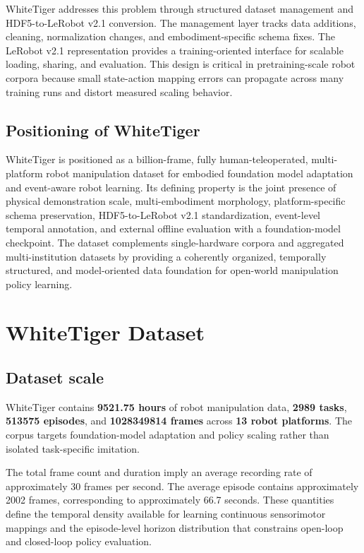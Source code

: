 WhiteTiger addresses this problem through structured dataset management and HDF5-to-LeRobot v2.1 conversion. The management layer tracks data additions, cleaning, normalization changes, and embodiment-specific schema fixes. The LeRobot v2.1 representation provides a training-oriented interface for scalable loading, sharing, and evaluation. This design is critical in pretraining-scale robot corpora because small state-action mapping errors can propagate across many training runs and distort measured scaling behavior.

\subsection{Positioning of WhiteTiger}

WhiteTiger is positioned as a billion-frame, fully human-teleoperated, multi-platform robot manipulation dataset for embodied foundation model adaptation and event-aware robot learning. Its defining property is the joint presence of physical demonstration scale, multi-embodiment morphology, platform-specific schema preservation, HDF5-to-LeRobot v2.1 standardization, event-level temporal annotation, and external offline evaluation with a foundation-model checkpoint. The dataset complements single-hardware corpora and aggregated multi-institution datasets by providing a coherently organized, temporally structured, and model-oriented data foundation for open-world manipulation policy learning.

\section{WhiteTiger Dataset}

\subsection{Dataset scale}

WhiteTiger contains \textbf{9521.75 hours} of robot manipulation data, \textbf{2989 tasks}, \textbf{513575 episodes}, and \textbf{1028349814 frames} across \textbf{13 robot platforms}. The corpus targets foundation-model adaptation and policy scaling rather than isolated task-specific imitation.

The total frame count and duration imply an average recording rate of approximately 30 frames per second. The average episode contains approximately 2002 frames, corresponding to approximately 66.7 seconds. These quantities define the temporal density available for learning continuous sensorimotor mappings and the episode-level horizon distribution that constrains open-loop and closed-loop policy evaluation.
